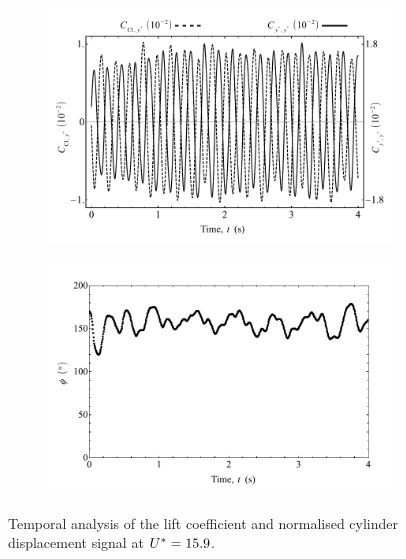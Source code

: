 \documentclass[oneside]{utmthesis}
\begin{document}
\begin{figure}
  \centering
  \begin{subfigure}[h]{1\textwidth}
    \includegraphics[width=\textwidth]{figs/tempAnalysisTransition-a}
    \caption{}
    \label{fig:tempAnalysisTransition-a}
  \end{subfigure}

  \begin{subfigure}[h]{0.98\textwidth}
    \includegraphics[width=\textwidth]{figs/tempAnalysisTransition-b}
    \caption{}
    \label{fig:tempAnalysisTransition-b}
  \end{subfigure}

  \caption{Temporal analysis of the lift coefficient and normalised cylinder displacement signal at $U^{*} = 15.9$.}
\end{figure}
\end{document}
